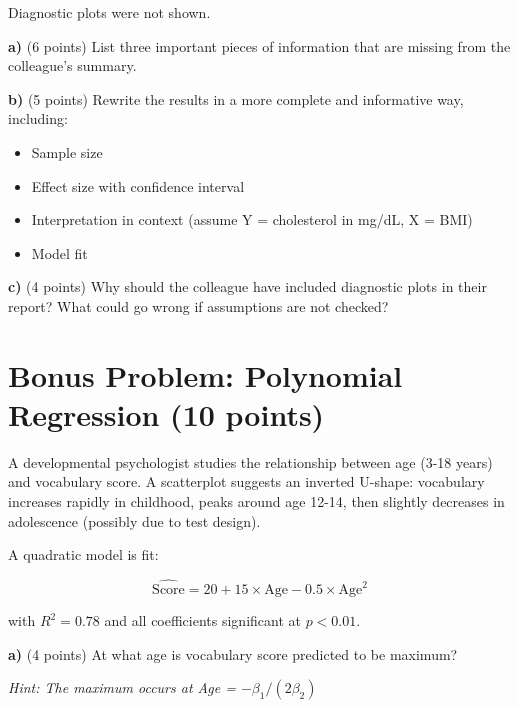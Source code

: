 \documentclass[11pt]{article}
\begin{document}
Diagnostic plots were not shown.

\vspace{0.5cm}

\textbf{a)} (6 points) List three important pieces of information that are missing from the colleague's summary.

\vspace{3cm}

\textbf{b)} (5 points) Rewrite the results in a more complete and informative way, including:
\begin{itemize}
\item Sample size
\item Effect size with confidence interval
\item Interpretation in context (assume Y = cholesterol in mg/dL, X = BMI)
\item Model fit
\end{itemize}

\vspace{4cm}

\textbf{c)} (4 points) Why should the colleague have included diagnostic plots in their report? What could go wrong if assumptions are not checked?

\vspace{3cm}

\newpage

\section*{Bonus Problem: Polynomial Regression (10 points)}

A developmental psychologist studies the relationship between age (3-18 years) and vocabulary score. A scatterplot suggests an inverted U-shape: vocabulary increases rapidly in childhood, peaks around age 12-14, then slightly decreases in adolescence (possibly due to test design).

A quadratic model is fit:

$$\widehat{\text{Score}} = 20 + 15 \times \text{Age} - 0.5 \times \text{Age}^2$$

with $R^2 = 0.78$ and all coefficients significant at $p < 0.01$.

\vspace{0.5cm}

\textbf{a)} (4 points) At what age is vocabulary score predicted to be maximum?

\textit{Hint: The maximum occurs at Age = $-\beta_1 / (2\beta_2)$}
\end{document}
